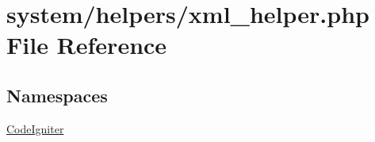 \hypertarget{xml__helper_8php}{\section{system/helpers/xml\-\_\-helper.php File Reference}
\label{xml__helper_8php}
}
\subsection*{Namespaces}
\begin{DoxyCompactItemize}
\item 
\hyperlink{namespace_code_igniter}{Code\-Igniter}
\end{DoxyCompactItemize}
